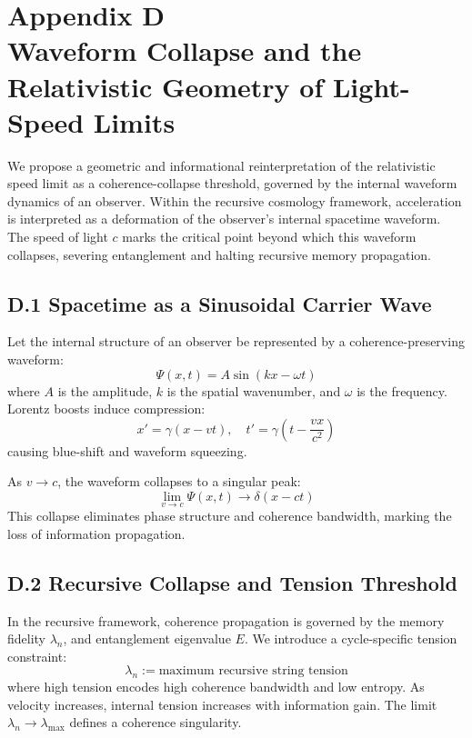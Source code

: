 \section*{Appendix D\\Waveform Collapse and the Relativistic Geometry of Light-Speed Limits}
\label{appendix:D}

We propose a geometric and informational reinterpretation of the relativistic speed limit as a coherence-collapse threshold, governed by the internal waveform dynamics of an observer. Within the recursive cosmology framework, acceleration is interpreted as a deformation of the observer’s internal spacetime waveform. The speed of light \( c \) marks the critical point beyond which this waveform collapses, severing entanglement and halting recursive memory propagation.

\subsection*{D.1 Spacetime as a Sinusoidal Carrier Wave}

Let the internal structure of an observer be represented by a coherence-preserving waveform:
\[
\Psi(x,t) = A \sin(kx - \omega t)
\]
where \( A \) is the amplitude, \( k \) is the spatial wavenumber, and \( \omega \) is the frequency. Lorentz boosts induce compression:
\[
x' = \gamma(x - vt), \quad t' = \gamma\left(t - \frac{vx}{c^2}\right)
\]
causing blue-shift and waveform squeezing.

As \( v \to c \), the waveform collapses to a singular peak:
\[
\lim_{v \to c} \Psi(x,t) \to \delta(x - ct)
\]
This collapse eliminates phase structure and coherence bandwidth, marking the loss of information propagation.

\subsection*{D.2 Recursive Collapse and Tension Threshold}

In the recursive framework, coherence propagation is governed by the memory fidelity \( \lambda_n \), and entanglement eigenvalue \( E \). We introduce a cycle-specific tension constraint:
\[
\lambda_n := \text{maximum recursive string tension}
\]
where high tension encodes high coherence bandwidth and low entropy. As velocity increases, internal tension increases with information gain. The limit \( \lambda_n \to \lambda_{\text{max}} \) defines a coherence singularity.

